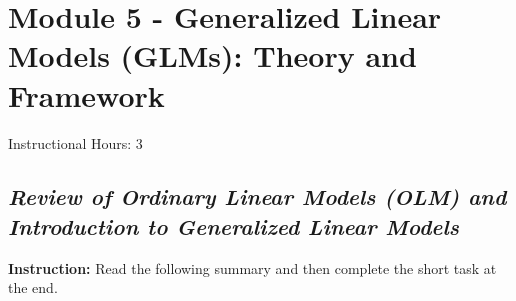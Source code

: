 \documentclass[12pt,a4paper]{article}
\begin{document}
\section*{Module 5 - Generalized Linear Models (GLMs): Theory and Framework}
Instructional Hours: 3

%
%

%
%
\subsection*{\textit{Review of Ordinary Linear Models (OLM) and Introduction to Generalized Linear Models}}

\textbf{Instruction:} Read the following summary and then complete the short task at the end.
\end{document}
